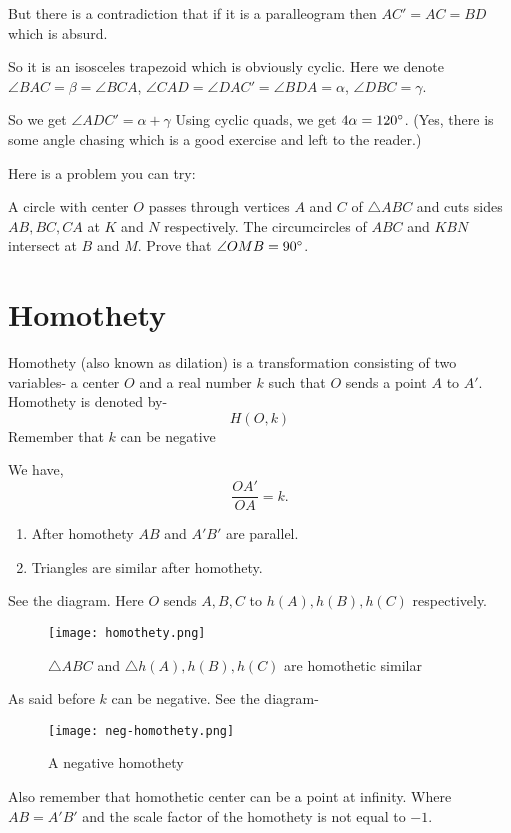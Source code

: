But there is a contradiction that if it is a paralleogram then $AC'=AC=BD$ which is absurd.

So it is an isosceles trapezoid which is obviously cyclic.
Here we denote $\angle BAC=\beta=\angle BCA$, $\angle CAD =\angle DAC'=\angle BDA=\alpha$, $\angle DBC=\gamma$.

So we get $\angle ADC'=\alpha +\gamma $
Using cyclic quads, we get $4\alpha=120^\circ$. (Yes, there is some angle chasing which is a good exercise and left to the reader.)

Here is a problem you can try:
\begin{problem}
A circle with center $O$ passes through vertices $A$ and $C$ of $\triangle ABC$ and cuts sides $AB,BC,CA$ at $K$ and $N$ respectively. The circumcircles of $ABC$ and $KBN$ intersect at $B$ and $M$. Prove that $\angle OMB=90^\circ$.
\end{problem}

\section{Homothety}
Homothety (also known as dilation) is a 
transformation consisting of two variables- 
a center $O$ and a real number $k$ such that
$O$ sends a point $A$ to $A'$.
Homothety is denoted by-
\[ H(O, k)\]
Remember that $k$ can be negative

We have, \[ \frac{OA'}{OA}=k.\]

\begin{enumerate}
	\item After homothety $AB$ and $A'B'$ are parallel.
	\item Triangles are similar after homothety.
\end{enumerate}
See the diagram. Here $O$ sends $A, B, C$ to $h(A), h(B), h(C)$ respectively.

\begin{figure}[ht]
\centering
	\texttt{[image: homothety.png]}
	\caption{$\triangle ABC$ and $\triangle  h(A), h(B), h(C)$ are homothetic similar}
\end{figure}
As said before $k$ can be negative. See the diagram-

\begin{figure}[ht]
\centering
	\texttt{[image: neg-homothety.png]}
	\caption{A negative homothety}
\end{figure}
Also remember that homothetic center can be a point at infinity. Where $AB=A'B'$ and the scale factor of the homothety is not equal to $-1$.



